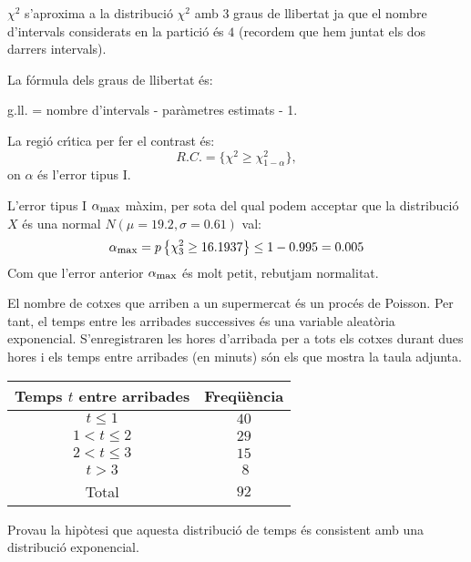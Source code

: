 {$\chi^2$ s'aproxima a la distribuci\'o
$\chi^2$ amb $3$ graus de llibertat ja que el nombre 
d'intervals considerats
en la partici\'o \'es $4$ (recordem que hem juntat els dos darrers intervals).

La f\'ormula dels graus de llibertat \'es:

g.ll. = nombre d'intervals - par\`ametres estimats - 1.

La regi\'o cr\'{\i}tica per fer el contrast \'es:
\[
R.C.=\{ \chi^2 \geq \chi_{1-\alpha}^2\},
\]
on $\alpha$ \'es l'error tipus I.

L'error tipus I $\alpha_{\mbox{\footnotesize max}}$ m\`axim,
per sota del qual podem 
acceptar que la distribuci\'o $X$ \'es una normal $N(\mu=19.2,
\sigma =0.61)$ val:
\[
\alpha_{\mbox{\footnotesize max}} =p\left\{\chi_3^2\geq 16.1937\right\}\leq 
1-0.995 =0.005
\]
Com que l'error anterior $\alpha_{\mbox{\footnotesize max}}$ \'es molt petit,
rebutjam normalitat.
}

\newpage

\begin{probres}
{El nombre de cotxes que arriben a un supermercat \'es un proc\'es de
Poisson. Per tant, el temps entre les arribades successives 
\'es una variable aleat\`oria
exponencial. S'enregistraren les hores d'arribada per a tots els cotxes durant
dues hores i els temps entre arribades (en minuts) s\'on els que mostra la taula
adjunta.
\begin{center}
\begin{tabular}{|c|c|}
\hline
Temps $t$ entre arribades & Freq\"u\`encia \\\hline\hline
$t\leq 1$&$40$\\\hline
$1<t\leq 2$&$29$\\\hline
$2<t\leq
3$&$15$\\\hline
$t>3$&$\ 8$\\\hline
Total&$92$\\\hline
\end{tabular}
\end{center}

Provau la hip\`otesi que aquesta distribuci\'o de
temps \'es consistent amb una distribuci\'o exponencial.}
\end{probres} 

